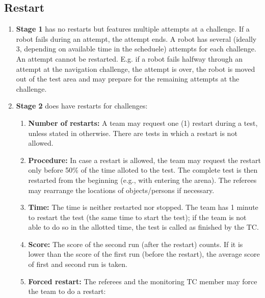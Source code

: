 \subsection{Restart}
\label{rule:restart}
\begin{enumerate}
	\item \textbf{Stage 1} has no restarts but features multiple attempts at a challenge. 
	If a robot fails during an attempt, the attempt ends. 
	A robot has several (ideally 3, depending on available time in the scheduele) attempts for each challenge. An attempt cannot be restarted. 
	E.g. if a robot fails halfway through an attempt at the navigation challenge, the attempt is over, the robot is moved out of the test area and may prepare for the remaining attempts at the challenge.

	\item \textbf{Stage 2} does have restarts for challenges:
	\begin{enumerate}
		\item \textbf{Number of restarts:} A team may request one (1) restart during a test, unless stated in otherwise. There are tests in which a restart is not allowed.
		\item \textbf{Procedure:} In case a restart is allowed, the team may request the restart only before 50\% of the time alloted to the test. The complete test is then restarted from the beginning (e.g., with entering the arena). The referees may rearrange the locations of objects/persons if necessary.
		\item \textbf{Time:} The time is neither restarted nor stopped. The team has 1 minute to restart the test (the same time to start the test); if the team is not able to do so in the allotted time, the test is called as finished by the TC.
		\item \textbf{Score:} The score of the second run (after the restart) counts. If it is lower than the score of the first run (before the restart), the average score of first and second run is taken.
		\item \textbf{Forced restart:} The referees and the monitoring TC member may force the team to do a restart:
	\end{enumerate}
\end{enumerate}



